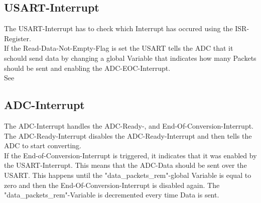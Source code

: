 

\pagebreak

\subsection{USART-Interrupt}

The USART-Interrupt has to check which Interrupt has occured using the ISR-Register.\\
If the Read-Data-Not-Empty-Flag is set the USART tells the ADC that it schould send data by changing a global Variable that indicates how many Packets should be sent and enabling the ADC-EOC-Interrupt.\\
See 



\pagebreak

\subsection{ADC-Interrupt}
\label{sec:ADCInt}

The ADC-Interrupt handles the ADC-Ready-, and End-Of-Conversion-Interrupt.\\
The ADC-Ready-Interrupt disables the ADC-Ready-Interrupt and then tells the ADC to start converting.\\
If the End-of-Conversion-Interrupt is triggered, it indicates that it was enabled by the USART-Interrupt. This means that the ADC-Data should be sent over the USART.
This happens until the "data\_packets\_rem"-global Variable is equal to zero and then the End-Of-Conversion-Interrupt is disabled again. The "data\_packets\_rem"-Variable is decremented every time Data is sent.



\pagebreak
